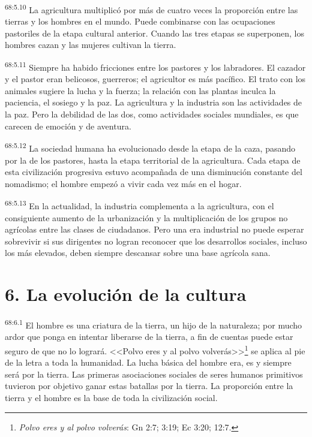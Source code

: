 \par
\textsuperscript{68:5.10} La agricultura multiplicó por más de cuatro veces la proporción entre las tierras y los hombres en el mundo. Puede combinarse con las ocupaciones pastoriles de la etapa cultural anterior. Cuando las tres etapas se superponen, los hombres cazan y las mujeres cultivan la tierra.

\par
\textsuperscript{68:5.11} Siempre ha habido fricciones entre los pastores y los labradores. El cazador y el pastor eran belicosos, guerreros; el agricultor es más pacífico. El trato con los animales sugiere la lucha y la fuerza; la relación con las plantas inculca la paciencia, el sosiego y la paz. La agricultura y la industria son las actividades de la paz. Pero la debilidad de las dos, como actividades sociales mundiales, es que carecen de emoción y de aventura.

\par
\textsuperscript{68:5.12} La sociedad humana ha evolucionado desde la etapa de la caza, pasando por la de los pastores, hasta la etapa territorial de la agricultura. Cada etapa de esta civilización progresiva estuvo acompañada de una disminución constante del nomadismo; el hombre empezó a vivir cada vez más en el hogar.

\par
\textsuperscript{68:5.13} En la actualidad, la industria complementa a la agricultura, con el consiguiente aumento de la urbanización y la multiplicación de los grupos no agrícolas entre las clases de ciudadanos. Pero una era industrial no puede esperar sobrevivir si sus dirigentes no logran reconocer que los desarrollos sociales, incluso los más elevados, deben siempre descansar sobre una base agrícola sana.

\section*{6. La evolución de la cultura}
\par
\textsuperscript{68:6.1} El hombre es una criatura de la tierra, un hijo de la naturaleza; por mucho ardor que ponga en intentar liberarse de la tierra, a fin de cuentas puede estar seguro de que no lo logrará. <<Polvo eres y al polvo volverás>>\footnote{\textit{Polvo eres y al polvo volverás}: Gn 2:7; 3:19; Ec 3:20; 12:7.} se aplica al pie de la letra a toda la humanidad. La lucha básica del hombre era, es y siempre será por la tierra. Las primeras asociaciones sociales de seres humanos primitivos tuvieron por objetivo ganar estas batallas por la tierra. La proporción entre la tierra y el hombre es la base de toda la civilización social.

